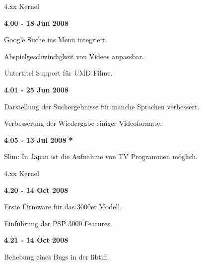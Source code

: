 \documentclass[mode=print,paper=screen,style=jefka]{powerdot}
\begin{document}
\begin{slide}{4.xx Kernel}
	\begin{large}\textbf{4.00 - 18 Jun 2008}\end{large}
	\begin{list}{-}{}
		\item{Google Suche ins Menü integriert.}
		\item{Abspielgeschwindigkeit von Videos anpassbar.}
		\item{Untertitel Support für UMD Filme.}
	\end{list}
	\begin{large}\textbf{4.01 - 25 Jun 2008}\end{large}
	\begin{list}{-}{}
		\item{Darstellung der Suchergebnisse für manche Sprachen verbessert.}
		\item{Verbesserung der Wiedergabe einiger Videoformate.}
	\end{list}
	\begin{large}\textbf{4.05 - 13 Jul 2008 *}\end{large}
	\begin{list}{-}{}
		\item{Slim: In Japan ist die Aufnahme von TV Programmen möglich.}
	\end{list}
\end{slide}

\begin{slide}{4.xx Kernel}
	\begin{large}\textbf{4.20 - 14 Oct 2008}\end{large}
	\begin{list}{-}{}
		\item{Erste Firmware für das 3000er Modell.}
		\item{Einführung der PSP 3000 Features.}
	\end{list}
	\begin{large}\textbf{4.21 - 14 Oct 2008}\end{large}
	\begin{list}{-}{}
		\item{Behebung eines Bugs in der libtiff.}
	\end{list}
\end{slide}
\end{document}
